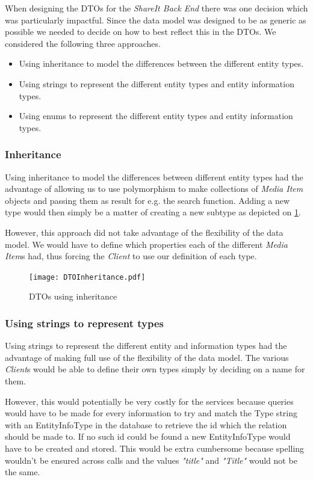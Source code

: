 \documentclass[../report.tex]{subfiles}
\begin{document}
When designing the DTOs for the \textit{ShareIt Back End} there was one decision which was particularly impactful. Since the data model was designed to be as generic as possible we needed to decide on how to best reflect this in the DTOs. We considered the following three approaches.
\begin{itemize}
\item Using inheritance to model the differences between the different entity types.
\item Using strings to represent the different entity types and entity information types.
\item Using enums to represent the different entity types and entity information types.
\end{itemize}

\subsubsection{Inheritance}
Using inheritance to model the differences between different entity types had the advantage of allowing us to use polymorphism to make collections of \textit{Media Item} objects and passing them as result for e.g. the search function. Adding a new type would then simply be a matter of creating a new subtype as depicted on \ref{fig:dto_inheritance}.
 
However, this approach did not take advantage of the flexibility of the data model. We would have to define which properties each of the different \textit{Media Item}s had, thus forcing the \textit{Client} to use our definition of each type.

\begin{figure}[!h]
\label{fig:dto_inheritance}
\centering
\texttt{[image: DTOInheritance.pdf]}
\caption{DTOs using inheritance}
\end{figure}

\subsubsection{Using strings to represent types}
Using strings to represent the different entity and information types had the advantage of making full use of the flexibility of the data model. The various \textit{Client}s would be able to define their own types simply by deciding on a name for them. 

However, this would potentially be very costly for the services because queries would have to be made for every information to try and match the Type string with an EntityInfoType in the database to retrieve the id which the relation should be made to. If no such id could be found a new EntityInfoType would have to be created and stored. This would be extra cumbersome because spelling wouldn't be ensured across calls and the values \textit{"title"} and \textit{"Title"} would not be the same.
 
\end{document}
